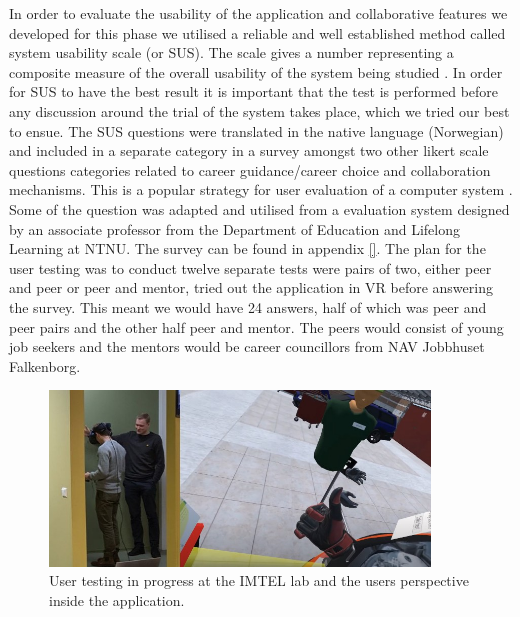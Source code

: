 In order to evaluate the usability of the application and collaborative features we developed for this phase we utilised a reliable and well established method called system usability scale (or SUS). The scale gives a number representing a composite measure of the overall usability of the system being studied \cite{brooke1996sus}. In order for SUS to have the best result it is important that the test is performed before any discussion around the trial of the system takes place, which we tried our best to ensue.
The SUS questions were translated in the native language (Norwegian) and included in a separate category in a survey amongst two other likert scale questions categories related to career guidance/career choice and collaboration mechanisms. This is a popular strategy for user evaluation of a computer system \cite{oates2005researching}. Some of the question was adapted and utilised from a evaluation system designed by an associate professor from the Department of Education and Lifelong Learning at NTNU. The survey can be found in appendix \ref{}.
The plan for the user testing was to conduct twelve separate tests were pairs of two, either peer and peer or peer and mentor, tried out the application in VR before answering the survey. This meant we would have 24 answers, half of which was peer and peer pairs and the other half peer and mentor. The peers would consist of young job seekers and the mentors would be career councillors from NAV Jobbhuset Falkenborg.


\begin{figure}[H]
  \centering
   \captionsetup{width=.9\linewidth}
    \includegraphics[width=0.9\textwidth]{fig/phase_2/phase2_testing.jpg}
 \caption{User testing in progress at the IMTEL lab and the users perspective inside the application.}
\label{fig:tastingPhase2}
\end{figure}


